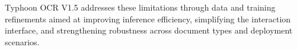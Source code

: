 \documentclass[]{typhoon} %
\begin{document}
Typhoon OCR V1.5 addresses these limitations through data and training refinements aimed at improving inference efficiency, simplifying the interaction interface, and strengthening robustness across document types and deployment scenarios.








\end{document}
